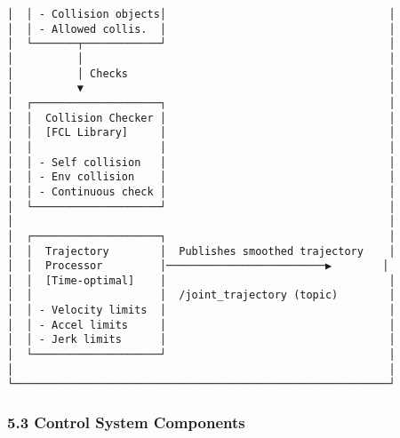 \documentclass[
]{article}
\begin{document}
\begin{verbatim}
│  │ - Collision objects│                                   │
│  │ - Allowed collis.  │                                   │
│  └───────┬────────────┘                                   │
│          │                                                │
│          │ Checks                                         │
│          ▼                                                │
│  ┌────────────────────┐                                   │
│  │  Collision Checker │                                   │
│  │  [FCL Library]     │                                   │
│  │                    │                                   │
│  │ - Self collision   │                                   │
│  │ - Env collision    │                                   │
│  │ - Continuous check │                                   │
│  └────────────────────┘                                   │
│                                                           │
│  ┌────────────────────┐                                   │
│  │  Trajectory        │  Publishes smoothed trajectory    │
│  │  Processor         │─────────────────────────▶        │
│  │  [Time-optimal]    │                                   │
│  │                    │  /joint_trajectory (topic)        │
│  │ - Velocity limits  │                                   │
│  │ - Accel limits     │                                   │
│  │ - Jerk limits      │                                   │
│  └────────────────────┘                                   │
│                                                           │
└───────────────────────────────────────────────────────────┘
\end{verbatim}

\hypertarget{control-system-components}{%
\subsubsection{5.3 Control System
Components}\label{control-system-components}}
\end{document}
